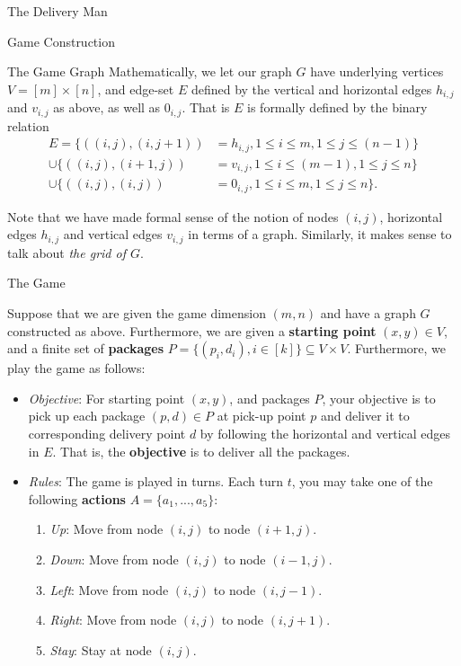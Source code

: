 \begin{section}{The Delivery Man}
\begin{subsection}{Game Construction}
\begin{subsubsection}{The Game Graph}
    Mathematically, we let our graph $G$ have underlying vertices $V = [m] \times [n]$, and edge-set $E$ defined by the vertical and horizontal edges $h_{i,j}$ and $v_{i,j}$ as above, as well as $0_{i,j}$. That is $E$ is formally defined by the binary relation
    \begin{equation}
      \begin{split}
      E = \{((i, j), (i, j+1)) &= h_{i,j}, 1 \leq i \leq m, 1 \leq j \leq (n-1)\}
      \\ \cup \{((i, j), (i+1, j)) &= v_{i,j}, 1 \leq i \leq (m-1), 1 \leq j \leq n \}
      \\ \cup \{((i, j), (i, j)) &= 0_{i,j}, 1 \leq i \leq m, 1 \leq j \leq n \}.
      \end{split}
    \end{equation}

    Note that we have made formal sense of the notion of nodes $(i, j)$, horizontal edges $h_{i,j}$ and vertical edges $v_{i,j}$ in terms of a graph. Similarly, it makes sense to talk about \textit{the grid of $G$}.

    \end{subsubsection}
    
    \begin{subsubsection}{The Game}

       Suppose that we are given the game dimension $(m, n)$ and have a graph $G$ constructed as above. Furthermore, we are given a \textbf{starting point} $(x, y)\in V$, and a finite set of \textbf{packages} $P = \{(p_i, d_i), i \in [k]\} \subseteq V\times V$. Furthermore, we play the game as follows:
      \begin{itemize}

        \item \textit{Objective}: For starting point $(x,y)$, and packages $P$, your objective is to pick up each package $(p,d)\in P$ at pick-up point $p$ and deliver it to corresponding delivery point $d$ by following the horizontal and vertical edges in $E$. That is, the \textbf{objective} is to deliver all the packages.

        \item \textit{Rules}:
          The game is played in turns. Each turn $t$, you may take one of the following \textbf{actions} $A = \{a_1, ..., a_5 \}$:
          \begin{enumerate}
              \setlength\itemsep{-1em}
          \item \textit{Up}: Move from node $(i, j)$ to node $(i+1, j)$.
          \item \textit{Down}: Move from node $(i, j)$ to node $(i-1, j)$.
          \item \textit{Left}: Move from node $(i, j)$ to node $(i, j-1)$.
          \item \textit{Right}: Move from node $(i, j)$ to node $(i, j+1)$.
          \item \textit{Stay}: Stay at node $(i, j)$.
          \end{enumerate}
          

\end{itemize}
\end{subsubsection}
\end{subsection}
\end{section}
